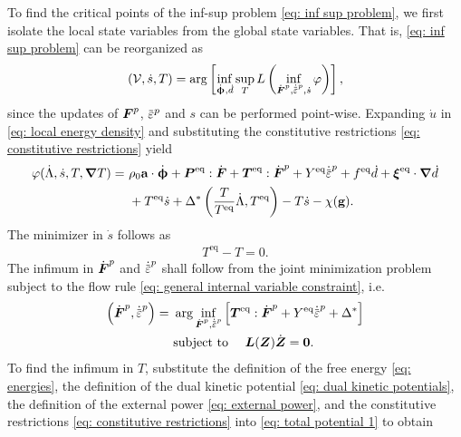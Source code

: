 To find the critical points of the inf-sup problem \eqref{eq: inf sup problem}, we first isolate the local state variables from the global state variables. That is, \eqref{eq: inf sup problem} can be reorganized as
\begin{align}
  \left( \mathcal{V}, \dot{s}, T \right) = \arg \left[ \inf_{\defrate, \dot{d}} \sup_T L\left( \inf_{\dot{\defgrad}^p, \epdot, \dot{s}} \varphi \right) \right],
\end{align}
since the updates of $\boldsymbol{F}^p$, $\ep$ and $s$ can be performed point-wise. Expanding $\dot{u}$ in \eqref{eq: local energy density} and substituting the constitutive restrictions \eqref{eq: constitutive restrictions} yield
\begin{equation}
  \begin{aligned}
    \varphi(\dot{\Lambda}, \dot{s}, T, \grad T) = & \ \rho_0\bta\cdot\defrate + \bfP^\text{eq}:\dot{\defgrad} + \bfT^\text{eq}:\dot{\defgrad}^p + Y^\text{eq}\epdot + f^\text{eq}\dot{d} + \bs{\xi}^\text{eq}\cdot\grad\dot{d} \\
                                                  & \ + T^\text{eq}\dot{s} + \Delta^*\left( \dfrac{T}{T^\text{eq}}\dot{\Lambda}, T^\text{eq} \right) - T\dot{s} - \chi(\btg).                                                  
  \end{aligned}
\end{equation}
The minimizer in $\dot{s}$ follows as
\begin{align}
  T^\text{eq} - T = 0.
\end{align}
The infimum in $\dot{\boldsymbol{F}}^p$ and $\epdot$ shall follow from the joint minimization problem subject to the flow rule \eqref{eq: general internal variable constraint}, i.e.
\begin{equation}
  \begin{aligned}
    \left( \dot{\defgrad}^p, \epdot \right) = & \ \arg\inf_{\dot{\defgrad}^p, \epdot} \left[ \bfT^\text{eq}:\dot{\defgrad}^p + Y^\text{eq}\epdot + \Delta^* \right] \\
                                              & \ \text{subject to }\quad \bfL(\bfZ)\dot{\bfZ} = \bs{0}.                                                            
  \end{aligned}
\end{equation}
To find the infimum in $T$, substitute the definition of the free energy \eqref{eq: energies}, the definition of the dual kinetic potential \eqref{eq: dual kinetic potentials}, the definition of the external power \eqref{eq: external power}, and the constitutive restrictions \eqref{eq: constitutive restrictions} into \eqref{eq: total potential 1} to obtain
